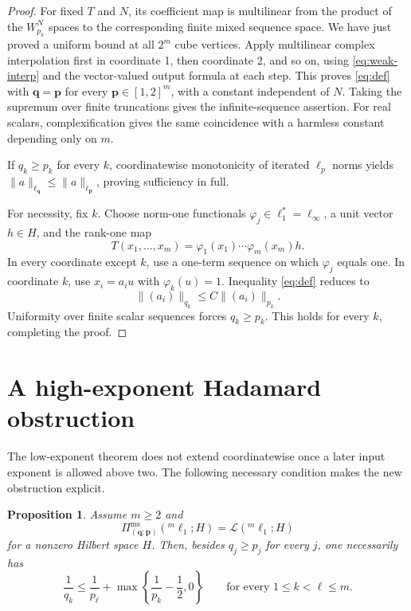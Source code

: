 \documentclass[11pt]{article}
\newtheorem{proposition}[theorem]{Proposition}
\newcommand{\Lcal}{\mathcal L}
\begin{document}
\begin{proof}
For fixed \(T\) and \(N\), its coefficient map is multilinear from the
product of the \(W_{p_k}^N\) spaces to the corresponding finite mixed
sequence space.  We have just proved a uniform bound at all \(2^m\) cube
vertices.  Apply multilinear complex interpolation first in coordinate 1,
then coordinate 2, and so on, using \eqref{eq:weak-interp} and the
vector-valued output formula at each step.  This proves \eqref{eq:def} with
\(\mathbf q=\mathbf p\) for every \(\mathbf p\in[1,2]^m\), with a constant
independent of \(N\).  Taking the supremum over finite truncations gives the
infinite-sequence assertion.  For real scalars, complexification gives the
same coincidence with a harmless constant depending only on \(m\).

If \(q_k\ge p_k\) for every \(k\), coordinatewise monotonicity of iterated
\(\ell_p\) norms yields
\(\|a\|_{\ell_{\mathbf q}}\le\|a\|_{\ell_{\mathbf p}}\), proving
sufficiency in full.

For necessity, fix \(k\).  Choose norm-one functionals
\(\varphi_j\in\ell_1^*=\ell_\infty\), a unit vector \(h\in H\), and the
rank-one map
\[
 T(x_1,\ldots,x_m)=\varphi_1(x_1)\cdots\varphi_m(x_m)h.
\]
In every coordinate except \(k\), use a one-term sequence on which
\(\varphi_j\) equals one.  In coordinate \(k\), use
\(x_i=a_i u\) with \(\varphi_k(u)=1\).  Inequality \eqref{eq:def} reduces to
\[
 \|(a_i)\|_{q_k}\le C\|(a_i)\|_{p_k}.
\]
Uniformity over finite scalar sequences forces \(q_k\ge p_k\).  This holds
for every \(k\), completing the proof.
\end{proof}

\section{A high-exponent Hadamard obstruction}

The low-exponent theorem does not extend coordinatewise once a later input
exponent is allowed above two.  The following necessary condition makes the
new obstruction explicit.

\begin{proposition}\label{prop:hadamard}
Assume \(m\ge2\) and
\[
 \Pi^{\mathrm{ms}}_{(\mathbf q;\mathbf p)}({}^m\ell_1;H)
 =\Lcal({}^m\ell_1;H)
\]
for a nonzero Hilbert space \(H\).  Then, besides \(q_j\ge p_j\) for every
\(j\), one necessarily has
\begin{equation}\label{eq:hadamard-obstruction}
 \frac1{q_k}\le \frac1{p_\ell}
 +\max\left\{\frac1{p_k}-\frac12,0\right\}
 \qquad\text{for every }1\le k<\ell\le m.
\end{equation}
\end{proposition}
\end{document}
